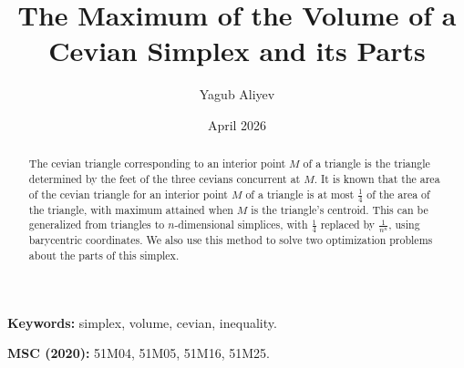 \documentclass{article}
\title{The Maximum of the Volume of a Cevian Simplex and its Parts}
\author{Yagub Aliyev}
\date{April 2026}
\begin{document}
\maketitle

\begin{abstract}
The cevian triangle corresponding to an interior point $M$ of a triangle is the triangle determined by
the feet of the three cevians concurrent at $M$. It is known that the area of the cevian triangle for an interior point $M$ of a triangle is at most $\frac{1}{4}$ of the area of the triangle, with maximum attained when $M$ is the
triangle's centroid. This can be generalized from triangles to $n$-dimensional simplices,
with $\frac{1}{4}$ replaced by $\frac{1}{n^n}$, using barycentric coordinates. We also use this method to solve two optimization problems about the parts of this simplex.
\end{abstract}

\noindent\textbf{Keywords:} simplex, volume, cevian, inequality.

\medskip

\noindent\textbf{MSC (2020):} 51M04, 51M05, 51M16, 51M25.

\medskip
\end{document}
